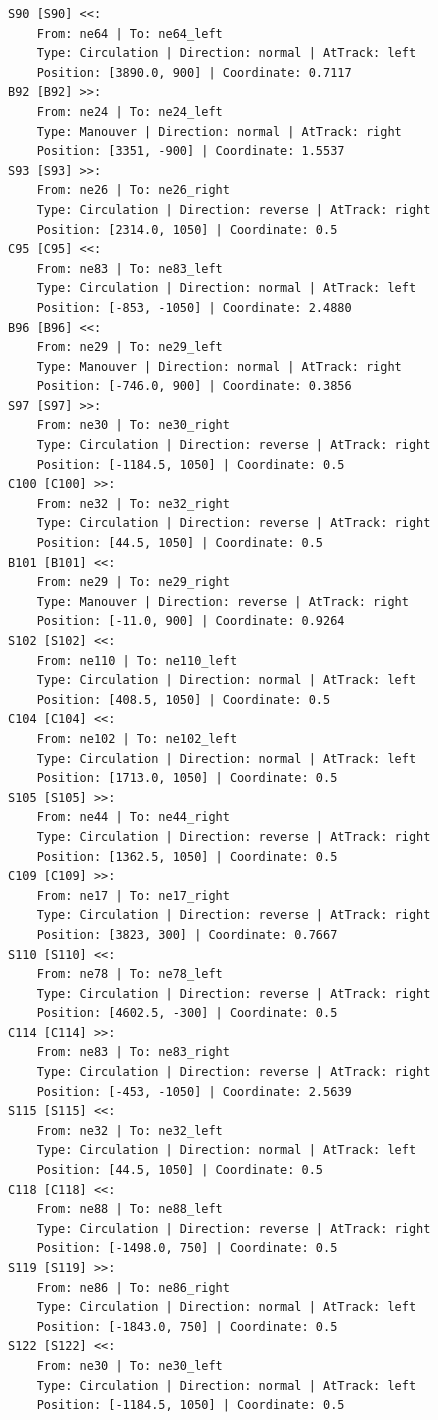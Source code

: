 \begin{lstlisting}[language = {}, tabsize=4, basicstyle=\footnotesize\ttfamily, showspaces=false, showstringspaces=false, caption = Signalling.RNA, label = {lst:EJ3_6}]
S90 [S90] <<:
	From: ne64 | To: ne64_left
	Type: Circulation | Direction: normal | AtTrack: left 
	Position: [3890.0, 900] | Coordinate: 0.7117
B92 [B92] >>:
	From: ne24 | To: ne24_left
	Type: Manouver | Direction: normal | AtTrack: right 
	Position: [3351, -900] | Coordinate: 1.5537
S93 [S93] >>:
	From: ne26 | To: ne26_right
	Type: Circulation | Direction: reverse | AtTrack: right 
	Position: [2314.0, 1050] | Coordinate: 0.5
C95 [C95] <<:
	From: ne83 | To: ne83_left
	Type: Circulation | Direction: normal | AtTrack: left 
	Position: [-853, -1050] | Coordinate: 2.4880
B96 [B96] <<:
	From: ne29 | To: ne29_left
	Type: Manouver | Direction: normal | AtTrack: right 
	Position: [-746.0, 900] | Coordinate: 0.3856
S97 [S97] >>:
	From: ne30 | To: ne30_right
	Type: Circulation | Direction: reverse | AtTrack: right 
	Position: [-1184.5, 1050] | Coordinate: 0.5
C100 [C100] >>:
	From: ne32 | To: ne32_right
	Type: Circulation | Direction: reverse | AtTrack: right 
	Position: [44.5, 1050] | Coordinate: 0.5
B101 [B101] <<:
	From: ne29 | To: ne29_right
	Type: Manouver | Direction: reverse | AtTrack: right 
	Position: [-11.0, 900] | Coordinate: 0.9264
S102 [S102] <<:
	From: ne110 | To: ne110_left
	Type: Circulation | Direction: normal | AtTrack: left 
	Position: [408.5, 1050] | Coordinate: 0.5
C104 [C104] <<:
	From: ne102 | To: ne102_left
	Type: Circulation | Direction: normal | AtTrack: left 
	Position: [1713.0, 1050] | Coordinate: 0.5
S105 [S105] >>:
	From: ne44 | To: ne44_right
	Type: Circulation | Direction: reverse | AtTrack: right 
	Position: [1362.5, 1050] | Coordinate: 0.5
C109 [C109] >>:
	From: ne17 | To: ne17_right
	Type: Circulation | Direction: reverse | AtTrack: right 
	Position: [3823, 300] | Coordinate: 0.7667
S110 [S110] <<:
	From: ne78 | To: ne78_left
	Type: Circulation | Direction: reverse | AtTrack: right 
	Position: [4602.5, -300] | Coordinate: 0.5
C114 [C114] >>:
	From: ne83 | To: ne83_right
	Type: Circulation | Direction: reverse | AtTrack: right 
	Position: [-453, -1050] | Coordinate: 2.5639
S115 [S115] <<:
	From: ne32 | To: ne32_left
	Type: Circulation | Direction: normal | AtTrack: left 
	Position: [44.5, 1050] | Coordinate: 0.5
C118 [C118] <<:
	From: ne88 | To: ne88_left
	Type: Circulation | Direction: reverse | AtTrack: right 
	Position: [-1498.0, 750] | Coordinate: 0.5
S119 [S119] >>:
	From: ne86 | To: ne86_right
	Type: Circulation | Direction: normal | AtTrack: left 
	Position: [-1843.0, 750] | Coordinate: 0.5
S122 [S122] <<:
	From: ne30 | To: ne30_left
	Type: Circulation | Direction: normal | AtTrack: left 
	Position: [-1184.5, 1050] | Coordinate: 0.5

\end{lstlisting}
